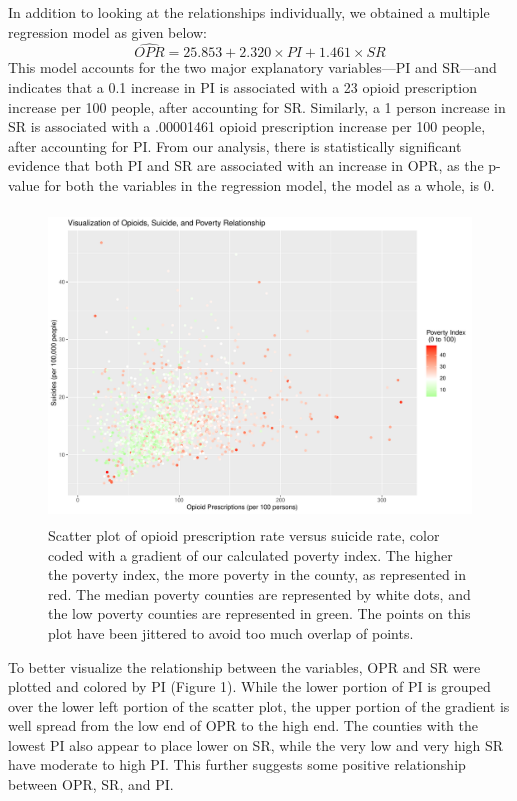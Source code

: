 \documentclass{article}
\newcommand{\<}{\langle}
\renewcommand{\>}{\rangle}
\theoremstyle{definition}
\begin{document}
In addition to looking at the relationships individually, we obtained a multiple regression model as given below:
\begin{equation*}
    \widehat{OPR} = 25.853	 + 2.320 \times PI + 1.461 \times SR 
\end{equation*}
This model accounts for the two major explanatory variables—PI and SR—and indicates that a 0.1 increase in PI is associated with a 23 opioid prescription increase per 100 people, after accounting for SR. Similarly, a 1 person increase in SR is associated with a .00001461 opioid prescription increase per 100 people, after accounting for PI. From our analysis, there is statistically significant evidence that both PI and SR are associated with an increase in OPR, as the p-value for both the variables in the regression model, the model as a whole, is 0. 

\begin{figure}[H]
    \centering
    \includegraphics[height = 8.25cm]{SPO.pdf}
    \caption{Scatter plot of opioid prescription rate versus suicide rate, color coded with a gradient of our calculated poverty index. The higher the poverty index, the more poverty in the county, as represented in red. The median poverty counties are represented by white dots, and the low poverty counties are represented in green. The points on this plot have been jittered to avoid too much overlap of points.}
    \label{fig:my_label}
\end{figure} 


To better visualize the relationship between the variables, OPR and SR were plotted and colored by PI (Figure 1). While the lower portion of PI is grouped over the lower left portion of the scatter plot, the upper portion of the gradient is well spread from the low end of OPR to the high end. The counties with the lowest PI also appear to place lower on SR, while the very low and very high SR have moderate to high PI. This further suggests some positive relationship between OPR, SR, and PI. 
\end{document}
